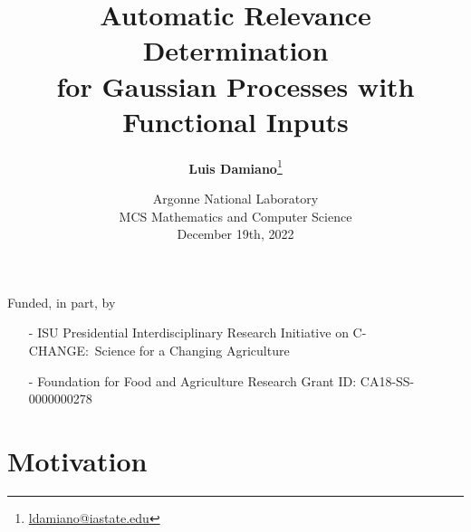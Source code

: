 \documentclass{snedecorbeamer}
\title{\textbf{Automatic Relevance Determination} \\
  for Gaussian Processes with Functional Inputs}
\author[Damiano et al]{
  \textbf{Luis Damiano}\footnote[2]{
    \tiny{\href{mailto:ldamiano@iastate.edu}{ldamiano@iastate.edu}}
  }}
\institute{
  Department of Statistics, Iowa State University
}
\date[December 19th, 2022]{
  \tiny{Argonne National Laboratory \\
    MCS Mathematics and Computer Science} \\
  December 19th, 2022}
\begin{document}
\begin{frame}
  \titlepage{}
  {
    \tiny{
      Funded, in part, by
      \begin{itemize}
      \item[-] ISU Presidential Interdisciplinary
	Research Initiative on C-CHANGE:~Science for a Changing
	Agriculture
      \item[-] Foundation for Food and Agriculture Research
	Grant ID: CA18-SS-0000000278
      \end{itemize}
    }
  }
\end{frame}

%
\section{Motivation}
\end{document}

